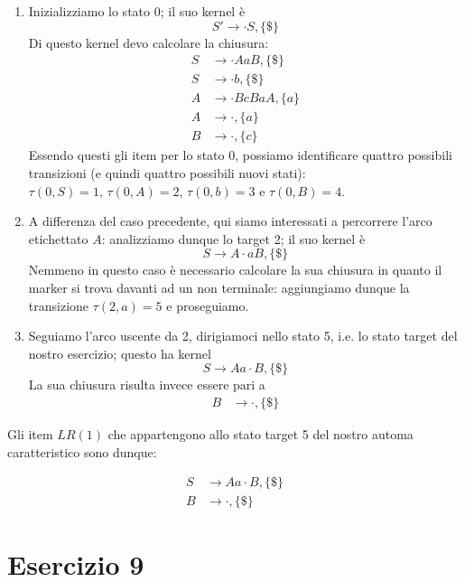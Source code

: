 \documentclass[class=book, crop=false, oneside, 12pt]{standalone}
\begin{document}
\begin{enumerate}
    \item Inizializziamo lo stato 0; il suo kernel è 
    \begin{equation*}
        S' \to \cdot S, \{\$\}
    \end{equation*}
    Di questo kernel devo calcolare la chiusura:
    \begin{align*}
        S &\to \cdot AaB, \{\$\} \\
        S &\to \cdot b, \{\$\} \\
        A &\to \cdot BcBaA, \{a\} \\
        A &\to \cdot, \{a\} \\
        B &\to \cdot, \{c\}
    \end{align*}
    Essendo questi gli item per lo stato 0, possiamo identificare quattro possibili transizioni (e quindi quattro possibili nuovi stati): \(\tau(0,S)=1 \textrm{, } \tau(0,A)=2 \textrm{, } \tau(0,b)=3 \textrm{ e } \tau(0,B)=4\).
    \item A differenza del caso precedente, qui siamo interessati a percorrere l'arco etichettato \(A\): analizziamo dunque lo target 2; il suo kernel è 
    \begin{equation*}
        S \to  A \cdot aB, \{\$\}
    \end{equation*}
    Nemmeno in questo caso è necessario calcolare la sua chiusura in quanto il marker si trova davanti ad un non terminale: aggiungiamo dunque la transizione \(\tau(2,a)=5 \) e proseguiamo.
    \item Seguiamo l'arco uscente da 2, dirigiamoci nello stato 5, i.e. lo stato target del nostro esercizio; questo ha kernel
    \begin{equation*}
        S \to  Aa \cdot B, \{\$\}
    \end{equation*}
    La sua chiusura risulta invece essere pari a 
    \begin{align*}
        B &\to \cdot, \{\$\}
    \end{align*}
\end{enumerate}

Gli item \(LR(1)\) che appartengono allo stato target 5 del nostro automa caratteristico sono dunque:

\begin{align*}
     S &\to  Aa \cdot B, \{\$\} \\
     B &\to \cdot, \{\$\}
\end{align*}

\section*{Esercizio 9}
\end{document}
